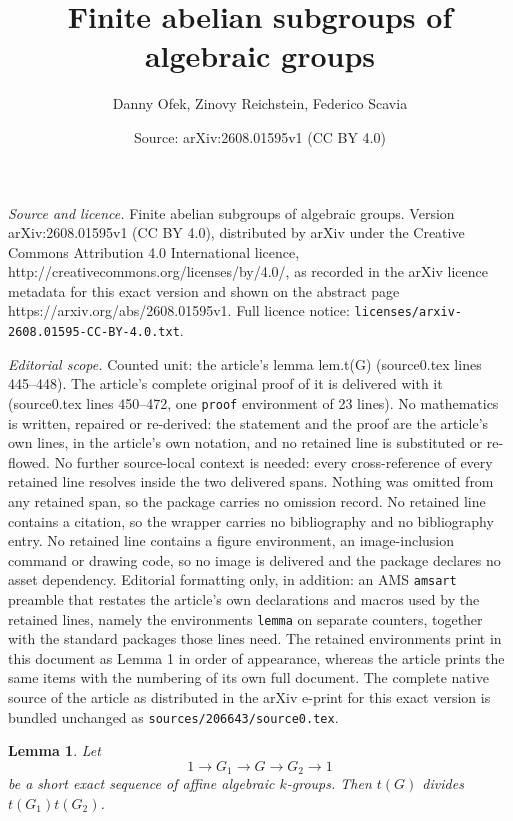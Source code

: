 \documentclass[10pt,a4paper]{amsart}
\title{Finite abelian subgroups of algebraic groups}
\author{Danny Ofek, Zinovy Reichstein, Federico Scavia}
\date{Source: arXiv:2608.01595v1 (CC BY 4.0)}
\newtheorem{lemma}{Lemma}
\begin{document}
\maketitle

\noindent\emph{Source and licence.} Finite abelian subgroups of algebraic groups. Version arXiv:2608.01595v1 (CC BY 4.0), distributed by arXiv under the Creative Commons Attribution 4.0 International licence, http://creativecommons.org/licenses/by/4.0/, as recorded in the arXiv licence metadata for this exact version and shown on the abstract page https://arxiv.org/abs/2608.01595v1. Full licence notice: \texttt{licenses/arxiv-2608.01595-CC-BY-4.0.txt}.\par\smallskip

\noindent\textit{Editorial scope.} Counted unit: the article's lemma lem.t(G) (source0.tex lines 445--448). The article's complete original proof of it is delivered with it (source0.tex lines 450--472, one \texttt{proof} environment of 23 lines). No mathematics is written, repaired or re-derived: the statement and the proof are the article's own lines, in the article's own notation, and no retained line is substituted or re-flowed.  No further source-local context is needed: every cross-reference of every retained line resolves inside the two delivered spans.  Nothing was omitted from any retained span, so the package carries no omission record.  No retained line contains a citation, so the wrapper carries no bibliography and no bibliography entry.  No retained line contains a figure environment, an image-inclusion command or drawing code, so no image is delivered and the package declares no asset dependency.  Editorial formatting only, in addition: an AMS \texttt{amsart} preamble that restates the article's own declarations and macros used by the retained lines, namely the environments \texttt{lemma} on separate counters, together with the standard packages those lines need.  The retained environments print in this document as Lemma 1 in order of appearance, whereas the article prints the same items with the numbering of its own full document.  The complete native source of the article as distributed in the arXiv e-print for this exact version is bundled unchanged as \texttt{sources/206643/source0.tex}.
\begin{lemma} \label{lem.t(G)}
Let 
\[1 \longrightarrow G_1 \longrightarrow G \longrightarrow G_2 \longrightarrow 1\] be a short exact sequence of affine algebraic $k$-groups. Then $t(G)$ divides $t(G_1) t(G_2)$.
\end{lemma}
\end{document}
